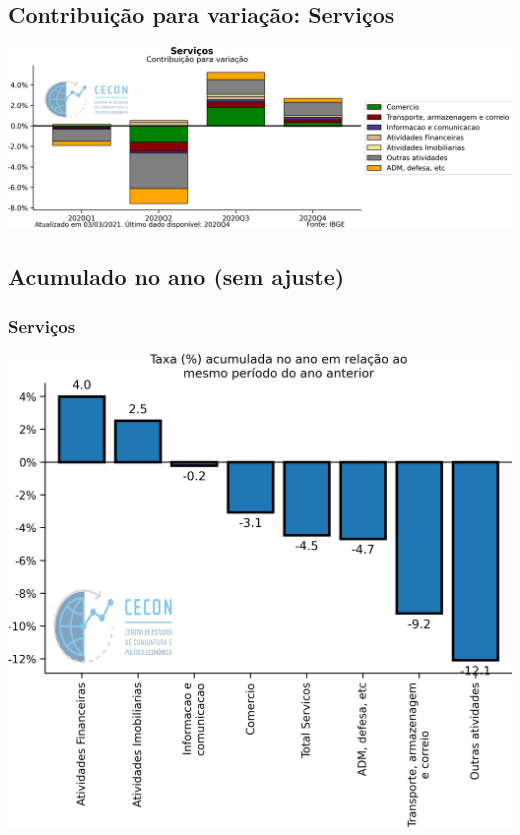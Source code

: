 \documentclass{SelfArx}
\begin{document}
\subsection*{Contribuição para variação: Serviços}
\label{sec:orgf5aa55b}

\begin{center}
\includegraphics[width=.9\linewidth]{./figs/PIB/Contrib_Servicos.png}
\end{center}

\subsection*{Acumulado no ano (sem ajuste)}
\label{sec:orga46b775}

\subsubsection*{Serviços}
\label{sec:orgacedb3b}

\begin{center}
\includegraphics[width=.9\linewidth]{./figs/PIB/Servicos_Acum.png}
\end{center}
\end{document}
